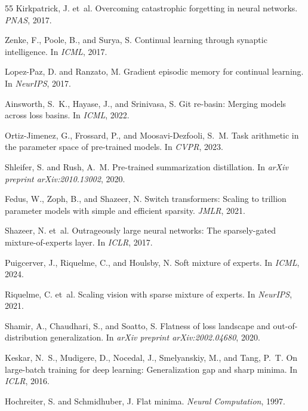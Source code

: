 \documentclass{article}
\theoremstyle{plain}
\theoremstyle{definition}
\theoremstyle{remark}
\begin{document}
\begin{thebibliography}{55}
Kirkpatrick, J. et~al.
\newblock Overcoming catastrophic forgetting in neural networks.
\newblock \emph{PNAS}, 2017.

Zenke, F., Poole, B., and Surya, S.
\newblock Continual learning through synaptic intelligence.
\newblock In \emph{ICML}, 2017.

Lopez-Paz, D. and Ranzato, M.
\newblock Gradient episodic memory for continual learning.
\newblock In \emph{NeurIPS}, 2017.

Ainsworth, S.~K., Hayase, J., and Srinivasa, S.
\newblock Git re-basin: Merging models across loss basins.
\newblock In \emph{ICML}, 2022.

Ortiz-Jimenez, G., Frossard, P., and Moosavi-Dezfooli, S.~M.
\newblock Task arithmetic in the parameter space of pre-trained models.
\newblock In \emph{CVPR}, 2023.

Shleifer, S. and Rush, A.~M.
\newblock Pre-trained summarization distillation.
\newblock In \emph{arXiv preprint arXiv:2010.13002}, 2020.

Fedus, W., Zoph, B., and Shazeer, N.
\newblock Switch transformers: Scaling to trillion parameter models with simple and efficient sparsity.
\newblock \emph{JMLR}, 2021.

Shazeer, N. et~al.
\newblock Outrageously large neural networks: The sparsely-gated mixture-of-experts layer.
\newblock In \emph{ICLR}, 2017.

Puigcerver, J., Riquelme, C., and Houlsby, N.
\newblock Soft mixture of experts.
\newblock In \emph{ICML}, 2024.

Riquelme, C. et~al.
\newblock Scaling vision with sparse mixture of experts.
\newblock In \emph{NeurIPS}, 2021.

Shamir, A., Chaudhari, S., and Soatto, S.
\newblock Flatness of loss landscape and out-of-distribution generalization.
\newblock In \emph{arXiv preprint arXiv:2002.04680}, 2020.

Keskar, N.~S., Mudigere, D., Nocedal, J., Smelyanskiy, M., and Tang, P.~T.
\newblock On large-batch training for deep learning: Generalization gap and sharp minima.
\newblock In \emph{ICLR}, 2016.

Hochreiter, S. and Schmidhuber, J.
\newblock Flat minima.
\newblock \emph{Neural Computation}, 1997.


\end{thebibliography}
\end{document}
